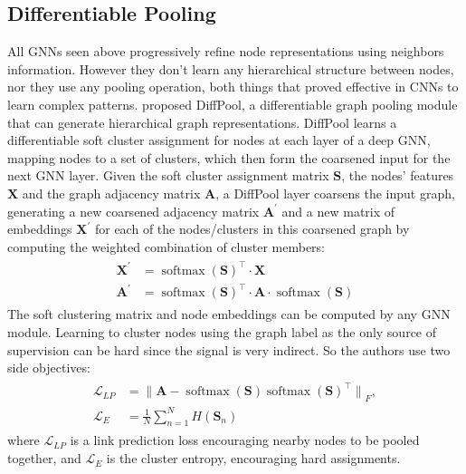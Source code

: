 \documentclass[journal]{IEEEtran}
\begin{document}
\subsection{Differentiable Pooling}
\label{sec:diffpool}
All GNNs seen above progressively refine node representations using neighbors information.
However they don't learn any hierarchical structure between nodes, nor they use any pooling operation, both things that proved effective in CNNs to learn complex patterns.
\citet{ying2018diffpool} proposed DiffPool, a differentiable graph pooling module that can generate hierarchical graph representations.
DiffPool learns a differentiable soft cluster assignment for nodes at each layer of a deep GNN, mapping nodes to a set of clusters, which then form the coarsened input for the next GNN layer.
Given the soft cluster assignment matrix $\mathbf{S}$, the nodes' features $\mathbf{X}$ and the graph adjacency matrix $\mathbf{A}$, a DiffPool layer coarsens the input graph, generating a new coarsened adjacency matrix $\mathbf{A}^{\prime}$ and a new matrix of embeddings $\mathbf{X}^{\prime}$ for each of the nodes/clusters in this coarsened graph by computing the weighted combination of cluster members:
\begin{align}
    \begin{aligned}
        \mathbf{X}^{\prime} &= {\operatorname{softmax}(\mathbf{S})}^{\top} \cdot \mathbf{X}\\
        \mathbf{A}^{\prime} &= {\operatorname{softmax}(\mathbf{S})}^{\top} \cdot \mathbf{A} \cdot \operatorname{softmax}(\mathbf{S})
    \end{aligned}
\end{align}
The soft clustering matrix and node embeddings can be computed by any GNN module.
Learning to cluster nodes using the graph label as the only source of supervision can be hard since the signal is very indirect.
So the authors use two side objectives:
\begin{align}
    \begin{aligned}
        \mathcal{L}_{LP} &= {\| \mathbf{A} - \operatorname{softmax}(\mathbf{S}) {\operatorname{softmax}(\mathbf{S})}^{\top} \|}_F,\\
        \mathcal{L}_E &= \frac{1}{N} \sum_{n=1}^N H(\mathbf{S}_n)
    \end{aligned}
\end{align}
where $\mathcal{L}_{LP}$ is a link prediction loss encouraging nearby nodes to be pooled together, and $\mathcal{L}_E$ is the cluster entropy, encouraging hard assignments.
\end{document}
